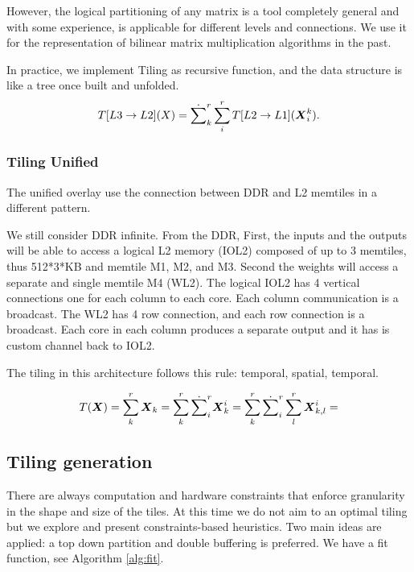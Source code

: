 \documentclass[acmsmall]{acmart}
\begin{document}
However, the logical partitioning of any matrix is a tool completely
general and with some experience, is applicable for different levels
and connections. We use it for the representation of bilinear matrix
multiplication algorithms in the past.

In practice, we implement Tiling as recursive function, and the data
structure is like a tree once built and unfolded.
\begin{equation}
  T[L3\rightarrow L2](X) = \dot\sum_k^r\sum_{i}^rT[L2\rightarrow L1]({\boldsymbol X}^{k}_{i}).
\end{equation}

\subsubsection{Tiling Unified}
The unified overlay use the connection between DDR and L2 memtiles in
a different pattern.

We still consider DDR infinite. From the DDR, First, the inputs and
the outputs will be able to access a logical L2 memory (IOL2) composed
of up to 3 memtiles, thus 512*3*KB and memtile M1, M2, and M3. Second
the weights will access a separate and single memtile M4 (WL2).  The
logical IOL2 has 4 vertical connections one for each column to each
core. Each column communication is a broadcast. The WL2 has 4 row
connection, and each row connection is a broadcast. Each core in each
column produces a separate output and it has is custom channel back to
IOL2.

The tiling in this architecture follows this rule: temporal, spatial,
temporal.

\begin{equation}
T({\boldsymbol X}) = \sum_k^r {\boldsymbol X}_k =
\sum_k^r\dot\sum_{i}^{r}{\boldsymbol X}^i_{k} =
\sum_k^r\dot\sum_{i}^{r}\sum_l^r{\boldsymbol X}_{k,l}^{i} =
\end{equation}



\subsection{Tiling generation}
\label{sec:tiling-generation}
There are always computation and hardware constraints that enforce
granularity in the shape and size of the tiles. At this time we do not
aim to an optimal tiling but we explore and present constraints-based
heuristics. Two main ideas are applied: a top down partition and
double buffering is preferred. We have a fit function, see Algorithm
\ref{alg:fit}.
\end{document}
